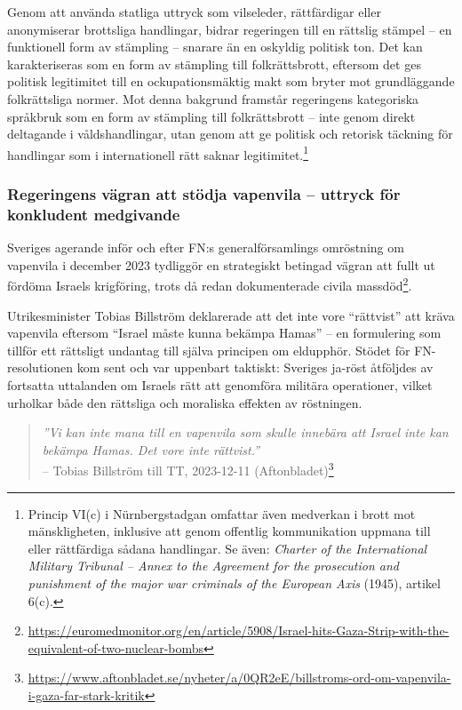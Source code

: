 Genom att använda statliga uttryck som vilseleder, rättfärdigar eller anonymiserar brottsliga handlingar, bidrar regeringen till en 
rättslig stämpel – en funktionell form av stämpling – snarare än en oskyldig politisk ton. 
Det kan karakteriseras som en form av stämpling till folkrättsbrott, eftersom det ges politisk legitimitet 
till en ockupationsmäktig makt som bryter mot grundläggande folkrättsliga normer.
Mot denna bakgrund framstår regeringens kategoriska språkbruk som en form av stämpling till 
folkrättsbrott – inte genom direkt deltagande i våldshandlingar, utan genom att ge politisk och retorisk 
täckning för handlingar som i internationell rätt saknar legitimitet.\footnote{Princip VI(c) i Nürnbergstadgan omfattar även medverkan i brott mot mänskligheten, inklusive att genom offentlig kommunikation uppmana till eller rättfärdiga sådana handlingar. Se även: \textit{Charter of the International Military Tribunal – Annex to the Agreement for the prosecution and punishment of the major war criminals of the European Axis} (1945), artikel 6(c).}




\subsubsection{Regeringens vägran att stödja vapenvila – uttryck för konkludent medgivande}

Sveriges agerande inför och efter FN:s generalförsamlings omröstning om vapenvila i december 2023 tydliggör en strategiskt betingad vägran att fullt ut fördöma Israels krigföring, trots då redan dokumenterade civila massdöd\footnote{\url{https://euromedmonitor.org/en/article/5908/Israel-hits-Gaza-Strip-with-the-equivalent-of-two-nuclear-bombs}}.

Utrikesminister Tobias Billström deklarerade att det inte vore “rättvist” att kräva vapenvila eftersom “Israel måste kunna bekämpa Hamas” – en formulering som tillför ett rättsligt undantag till själva principen om eldupphör. Stödet för FN-resolutionen kom sent och var uppenbart taktiskt: Sveriges ja-röst åtföljdes av fortsatta uttalanden om Israels rätt att genomföra militära operationer, vilket urholkar både den rättsliga och moraliska effekten av röstningen.

\begin{quote}
\textit{”Vi kan inte mana till en vapenvila som skulle innebära att Israel inte kan bekämpa Hamas. Det vore inte rättvist.”} \\
– Tobias Billström till TT, 2023-12-11 (Aftonbladet)\footnote{\url{https://www.aftonbladet.se/nyheter/a/0QR2eE/billstroms-ord-om-vapenvila-i-gaza-far-stark-kritik}}
\end{quote}

